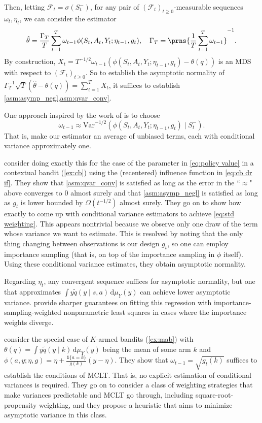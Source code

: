 Then, letting $\mathcal{F}_t = \sigma(S^-_t)$, for any pair of $(\mathcal{F}_t)_{t \geq 0}$-measurable sequences $\omega_t,\eta_t$, we can consider the estimator
$$
\hat\theta = \frac{\Gamma_T}T\sum_{t=1}^T\omega_{t-1}\phi(S_t,A_t,Y_t;\eta_{t-1},g_t),\quad\Gamma_T=\prns{\frac1T\sum_{t=1}^T\omega_{t-1}}^{-1}.
$$
By construction, $X_t=T^{-1/2}\omega_{t-1}(\phi(S_t,A_t,Y_t;\eta_{t-1},g_t)-\theta(q))$ is an MDS with respect to $(\mathcal{F}_t)_{t \geq 0}$. So to establish the asymptotic normality of $\Gamma_T^{-1}\sqrt{T}(\hat\theta-\theta(q))=\sum_{t=1}^T X_t$, it suffices to establish \cref{asm:asymp_negl,asm:qvar_conv}.

One approach inspired by the work of \citet{luedtke2016statistical} is to choose \begin{equation}\label{eq:std weighting}\omega_{t-1}\approx \mathrm{Var}^{-1/2}(\phi(S_t,A_t,Y_t;\eta_{t-1},g_t)\mid S^-_t).\end{equation}
That is, make our estimator an average of unbiased terms, each with conditional variance approximately one.

\citet{bibaut2021post} consider doing exactly this for the case of the parameter in \cref{eq:policy value} in a contextual bandit (\cref{ex:cb}) using the (recentered) influence function in \cref{eq:cb dr if}.
They show that \cref{asm:qvar_conv} is satisfied as long as the error in the ``$\approx$" above converges to 0 almost surely and that \cref{asm:asymp_negl} is satisfied as long as $g_t$ is lower bounded by $\Omega(t^{-1/2})$ almost surely. They go on to show how exactly to come up with conditional variance estimators to achieve \cref{eq:std weighting}. This appears nontrivial because we observe only one draw of the term whose variance we want to estimate. This is resolved by noting that the only thing changing between observations is our design $g_t$, so one can employ importance sampling (that is, on top of the importance sampling in $\phi$ itself). Using these conditional variance estimates, they obtain asymptotic normality. 

Regarding $\eta_t$, any convergent sequence suffices for asymptotic normality, but one that approximates $\int y\widetilde q(y\mid s,a)\,\mathrm{d}\mu_Y(y)$ can achieve lower asymptotic variance. \citet{bibaut2021risk} provide sharper guarantees on fitting this regression with importance-sampling-weighted nonparametric least squares in cases where the importance weights diverge.

\citet{hadad2021confidence} consider the special case of $K$-armed bandits (\cref{ex:mab}) with $\theta(q)=\int y\widetilde q(y\mid k)\,\mathrm{d}\mu_Y(y)$ being the mean of some arm $k$ and $\phi(a,y;\eta,g)=\eta+\frac{\bm1\{a=k\}}{g(k)}(y-\eta)$. They show that $\omega_{t-1}=\sqrt{g_{t}(k)}$ suffices to establish the conditions of MCLT. That is, no explicit estimation of conditional variances is required. They go on to consider a class of weighting strategies that make variances predictable and MCLT go through, including square-root-propensity weighting, and they propose a heuristic that aims to minimize asymptotic variance in this class.

